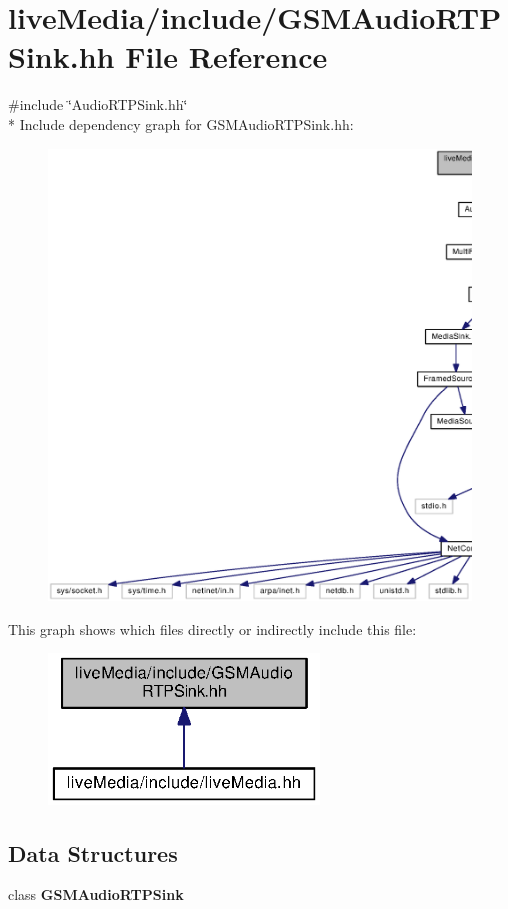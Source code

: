 \section{live\+Media/include/\+G\+S\+M\+Audio\+R\+T\+P\+Sink.hh File Reference}
\label{GSMAudioRTPSink_8hh}
{\ttfamily \#include \char`\"{}Audio\+R\+T\+P\+Sink.\+hh\char`\"{}}\\*
Include dependency graph for G\+S\+M\+Audio\+R\+T\+P\+Sink.\+hh\+:
\nopagebreak
\begin{figure}[H]
\begin{center}
\leavevmode
\includegraphics[width=350pt]{GSMAudioRTPSink_8hh__incl}
\end{center}
\end{figure}
This graph shows which files directly or indirectly include this file\+:
\nopagebreak
\begin{figure}[H]
\begin{center}
\leavevmode
\includegraphics[width=204pt]{GSMAudioRTPSink_8hh__dep__incl}
\end{center}
\end{figure}
\subsection*{Data Structures}
\begin{DoxyCompactItemize}
\item 
class {\bf G\+S\+M\+Audio\+R\+T\+P\+Sink}
\end{DoxyCompactItemize}
